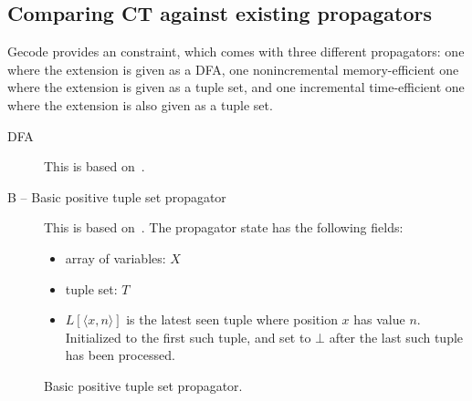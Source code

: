 \documentclass[a4paper,11pt]{article}
\newcommand{\Extensional}{\Constraint{Extensional}~}
\newcommand{\FOREACH}[1]{\FORALL{{#1} \textbf{do}}}
\newcommand{\ENDFOREACH}{\ENDFOR}
\def\PROCEDURE{\item[\textbf{PROCEDURE}]}
\def\bool{\mathit{bool}}
\def\Extensional{\textsc{Extensional}}
\numberwithin{equation}{section}
\begin{document}
\subsection{Comparing CT against existing propagators}

Gecode provides an  constraint, which
comes with three different propagators: one where the extension
is given as a DFA, one nonincremental memory-efficient one where
the extension is given as a tuple set, and one incremental
time-efficient one where the extension is also given as a tuple set.

\begin{description}
  \item[DFA] This is based on~\cite{Pesant:seqs}.
  \item[B -- Basic positive tuple set propagator]
    This is based on~\cite{DBLP:journals/ai/BessiereRYZ05}.
     The propagator state has the following fields:

     \begin{itemize}
     \item array of variables: $X$
     \item tuple set: $T$
     \item $L[\langle x,n \rangle]$ is the latest seen tuple where position
       $x$ has value $n$.  Initialized to the first such tuple, and set to
       $\bot$ after the last such tuple has been processed.
     \end{itemize}

     \begin{algorithm}
       \caption{Basic positive tuple set propagator.}
     \end{algorithm}
\clearpage


\end{description}
\end{document}

